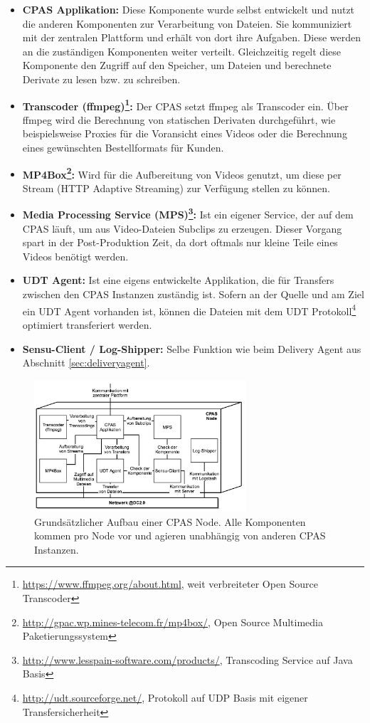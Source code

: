 \begin{itemize}
	\item \textbf{CPAS Applikation:} Diese Komponente wurde selbst entwickelt und nutzt die anderen Komponenten zur Verarbeitung von Dateien. Sie kommuniziert mit der zentralen Plattform und erhält von dort ihre Aufgaben. Diese werden an die zuständigen Komponenten weiter verteilt. Gleichzeitig regelt diese Komponente den Zugriff auf den Speicher, um Dateien und berechnete Derivate zu lesen bzw. zu schreiben.
	\item \textbf{Transcoder (ffmpeg)\footnote{\url{https://www.ffmpeg.org/about.html}, weit verbreiteter Open Source Transcoder}:} Der CPAS setzt ffmpeg als Transcoder ein. Über ffmpeg wird die Berechnung von statischen Derivaten durchgeführt, wie beispielsweise Proxies für die Voransicht eines Videos oder die Berechnung eines gewünschten Bestellformats für Kunden.
	\item \textbf{MP4Box\footnote{\url{http://gpac.wp.mines-telecom.fr/mp4box/}, Open Source Multimedia Paketierungssystem}:} Wird für die Aufbereitung von Videos genutzt, um diese per Stream (HTTP Adaptive Streaming) zur Verfügung stellen zu können.
	\item \textbf{Media Processing Service (MPS)\footnote{\url{http://www.lesspain-software.com/products/}, Transcoding Service auf Java Basis}:} Ist ein eigener Service, der auf dem CPAS läuft, um aus Video-Dateien Subclips zu erzeugen. Dieser Vorgang spart in der Post-Produktion Zeit, da dort oftmals nur kleine Teile eines Videos benötigt werden. 
	\item \textbf{UDT Agent:} Ist eine eigens entwickelte Applikation, die für Transfers zwischen den CPAS Instanzen zuständig ist. Sofern an der Quelle und am Ziel ein UDT Agent vorhanden ist, können die Dateien mit dem UDT Protokoll\footnote{\url{http://udt.sourceforge.net/}, Protokoll auf UDP Basis mit eigener Transfersicherheit} optimiert transferiert werden.
	\item \textbf{Sensu-Client / Log-Shipper:} Selbe Funktion wie beim Delivery Agent aus Abschnitt \ref{sec:deliveryagent}.
\end{itemize}

\begin{figure}[ht]
	\centering
	\includegraphics[width=0.7\textwidth]{img/cpas_node.png}
	\caption[Aufbau einer CPAS Node]{Grundsätzlicher Aufbau einer CPAS Node. Alle Komponenten kommen pro Node vor und agieren unabhängig von anderen CPAS Instanzen.}
	\label{fig:cpas}
\end{figure} 

